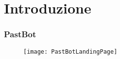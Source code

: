 
\section{Introduzione}
\begin{frame}

  \frametitle{PastBot}

  \begin{figure}[H]
    \centering
    \texttt{[image: PastBotLandingPage]}
  \end{figure}

  
\end{frame}
